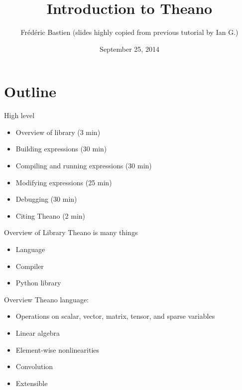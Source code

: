 \documentclass[utf8x,xcolor=pdftex,dvipsnames,table]{beamer}
\title{Introduction to Theano}
\author{%
\footnotesize
Frédéric Bastien \newline
(slides highly copied from previous tutorial by Ian G.) \newline
}
\date{September 25, 2014}
\begin{document}
\begin{frame}[plain]
 \titlepage
 \vspace{-5em}
 \hfill
\end{frame}

\section{Outline}
\begin{frame}{High level}\setcounter{page}{1}
  \begin{itemize}
  \item Overview of library (3 min)
  \item Building expressions (30 min)
  \item Compiling and running expressions (30 min)
  \item Modifying expressions (25 min)
  \item Debugging (30 min)
  \item Citing Theano (2 min)
  \end{itemize}
\end{frame}


\begin{frame}{Overview of Library}
  Theano is many things
  \begin{itemize}
  \item Language
  \item Compiler
  \item Python library
  \end{itemize}
\end{frame}

\begin{frame}{Overview}
  Theano language:
  \begin{itemize}
  \item Operations on scalar, vector, matrix, tensor, and sparse variables
  \item Linear algebra
  \item Element-wise nonlinearities
  \item Convolution
  \item Extensible
  \end{itemize}
\end{frame}
\end{document}
